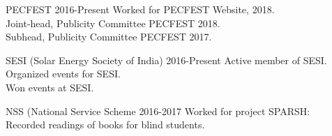  
\begin{entryzlist}

\entryz

{PECFEST {}}
{2016-Present}
{Worked for PECFEST Website, 2018.
\\
Joint-head, Publicity Committee PECFEST 2018.
\\
Subhead, Publicity Committee PECFEST 2017.}

\entryz

{SESI (Solar Energy Society of India) {}}
{2016-Present}
{Active member of SESI.
\\
Organized events for SESI.
\\
Won events at SESI.}


\entryz

{NSS (National Service Scheme {}}
{2016-2017}
{Worked for project SPARSH: 
\\
Recorded readings of books for blind students.}



\end{entryzlist}